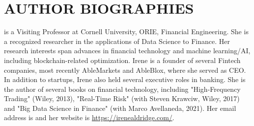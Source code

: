 \documentclass{wscpaperproc}
\theoremstyle{wsc}
\begin{document}
\footnotesize





\section*{AUTHOR BIOGRAPHIES}

 is a Visiting Professor at Cornell University, ORIE, Financial Engineering. She is a recognized researcher in the applications of Data Science to Finance. Her research interests span advances in financial technology and machine learning/AI, including blockchain-related optimization. Irene is a founder of several Fintech companies, most recently AbleMarkets and AbleBlox, where she served as CEO. In addition to startups, Irene also held several executive roles in banking. She is the author of several books on financial technology, including "High-Frequency Trading" (Wiley, 2013), "Real-Time Risk" (with Steven Krawciw, Wiley, 2017) and "Big Data Science in Finance" (with Marco Avellaneda, 2021).  Her email address is  and her website is \url{https://irenealdridge.com/}.\\
\end{document}
